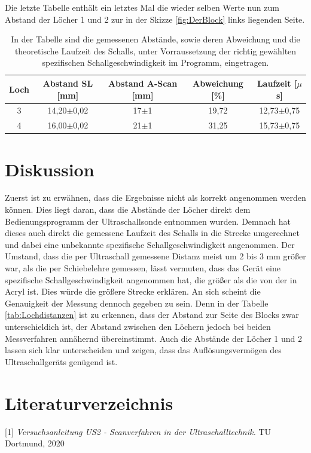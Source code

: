\documentclass[titlepage = firstcover]{scrartcl}
\begin{document}
            \FloatBarrier
            \noindent

            Die letzte Tabelle enthält ein letztes Mal die wieder selben Werte nun zum Abstand der Löcher 1 und 2 zur in der Skizze \ref{fig:DerBlock} links liegenden Seite.

            \begin{table}[h]
              \centering
              \caption{In der Tabelle sind die gemessenen Abstände, sowie deren Abweichung und die theoretische Laufzeit des Schalls, unter Vorraussetzung der richtig gewählten spezifischen Schallgeschwindigkeit im Programm, eingetragen.}
              \label{tab:Auflösung2}

              \begin{tabular}{c c c c c}
                  \toprule
                  {Loch} & {Abstand SL [mm]} & {Abstand A-Scan [mm]} & {Abweichung [\%]} & {Laufzeit [$\mu$s]}  \\
                  \midrule
                  3   &   14,20$\pm$0,02   &   17$\pm$1  &   19,72    &   12,73$\pm$0,75   \\
                  4   &   16,00$\pm$0,02   &   21$\pm$1  &   31,25    &   15,73$\pm$0,75   \\   
                  \bottomrule
              \end{tabular}

            \end{table}

            \FloatBarrier
            \noindent

    \newpage
    \section{Diskussion}
      Zuerst ist zu erwähnen, dass die Ergebnisse nicht als korrekt angenommen werden können. Dies liegt daran, dass die Abstände der Löcher direkt dem Bedienungsprogramm der Ultraschallsonde
      entnommen wurden. Demnach hat dieses auch direkt die gemessene Laufzeit des Schalls in die Strecke umgerechnet und dabei eine unbekannte spezifische Schallgeschwindigkeit angenommen. Der 
      Umstand, dass die per Ultraschall gemessene Distanz meist um 2 bis 3 mm größer war, als die per Schiebelehre gemessen, lässt vermuten, dass das Gerät eine spezifische Schallgeschwindigkeit
      angenommen hat, die größer als die von der in Acryl ist. Dies würde die größere Strecke erklären. An sich scheint die Genauigkeit der Messung dennoch gegeben zu sein. Denn in der Tabelle
      \ref{tab:Lochdistanzen} ist zu erkennen, dass der Abstand zur Seite des Blocks zwar unterschieldich ist, der Abstand zwischen den Löchern jedoch bei beiden Messverfahren annähernd übereinstimmt.
      Auch die Abstände der Löcher 1 und 2 lassen sich klar unterscheiden und zeigen, dass das Auflösungsvermögen des Ultraschallgeräts genügend ist. 
      
    \section{Literaturverzeichnis}
    [1] \textit{Versuchsanleitung US2 - Scanverfahren in der Ultraschalltechnik.} TU Dortmund, 2020 \newline

    
\end{document}
